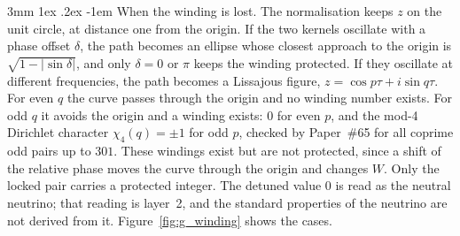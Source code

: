 \documentclass[%
 reprint, amsmath,amssymb, aps, prb, ]{revtex4-2}
\makeatletter
\numberwithin{equation}{section}
\renewcommand\paragraph{%
  \@startsection{paragraph}{4}{\z@}%
    {3mm \@plus 1ex \@minus .2ex}%
    {-1em}%
    {\normalfont\normalsize\itshape}}
\makeatother
\begin{document}
\paragraph{When the winding is lost.} The normalisation keeps $z$ on the unit circle, at distance one from the origin. If the two kernels oscillate with a phase offset $\delta$, the path becomes an ellipse whose closest approach to the origin is $\sqrt{1 - \lvert\sin\delta\rvert}$, and only $\delta = 0$ or $\pi$ keeps the winding protected. If they oscillate at different frequencies, the path becomes a Lissajous figure, $z = \cos p\tau + i\sin q\tau$. For even $q$ the curve passes through the origin and no winding number exists. For odd $q$ it avoids the origin and a winding exists: $0$ for even $p$, and the mod-4 Dirichlet character $\chi_4(q) = \pm1$ for odd $p$, checked by Paper~\#65 for all coprime odd pairs up to $301$. These windings exist but are not protected, since a shift of the relative phase moves the curve through the origin and changes $W$. Only the locked pair carries a protected integer. The detuned value $0$ is read as the neutral neutrino; that reading is layer~2, and the standard properties of the neutrino are not derived from it. Figure~\ref{fig:g_winding} shows the cases.
\end{document}
